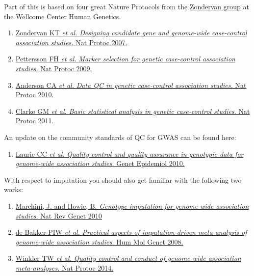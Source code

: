 \documentclass[
]{book}
\providecommand{\tightlist}{%
  \setlength{\itemsep}{0pt}\setlength{\parskip}{0pt}}
\begin{document}
Part of this is based on four great Nature Protocols from the \href{https://www.well.ox.ac.uk/research/research-groups/zondervan-group}{Zondervan group} at the Wellcome Center Human Genetics.

\begin{enumerate}
\def\labelenumi{\arabic{enumi}.}
\tightlist
\item
  \href{https://www.ncbi.nlm.nih.gov/pubmed/17947991}{Zondervan KT \emph{et al.} \emph{Designing candidate gene and genome-wide case-control association studies.} Nat Protoc 2007.}
\item
  \href{https://www.ncbi.nlm.nih.gov/pubmed/19390530}{Pettersson FH \emph{et al.} \emph{Marker selection for genetic case-control association studies.} Nat Protoc 2009.}
\item
  \href{https://www.ncbi.nlm.nih.gov/pubmed/21085122}{Anderson CA \emph{et al.} \emph{Data QC in genetic case-control association studies.} Nat Protoc 2010.}
\item
  \href{https://www.ncbi.nlm.nih.gov/pubmed/21293453}{Clarke GM \emph{et al.} \emph{Basic statistical analysis in genetic case-control studies.} Nat Protoc 2011.}
\end{enumerate}

An update on the community standards of QC for GWAS can be found here:

\begin{enumerate}
\def\labelenumi{\arabic{enumi}.}
\tightlist
\item
  \href{https://www.ncbi.nlm.nih.gov/pubmed/20718045}{Laurie CC \emph{et al.} \emph{Quality control and quality assurance in genotypic data for genome-wide association studies.} Genet Epidemiol 2010.}
\end{enumerate}

With respect to imputation you should also get familiar with the following two works:

\begin{enumerate}
\def\labelenumi{\arabic{enumi}.}
\tightlist
\item
  \href{https://doi.org/10.1038/nrg2796}{Marchini, J. and Howie, B. \emph{Genotype imputation for genome-wide association studies.} Nat Rev Genet 2010}
\item
  \href{https://www.ncbi.nlm.nih.gov/pubmed/18852200}{de Bakker PIW \emph{et al.} \emph{Practical aspects of imputation-driven meta-analysis of genome-wide association studies.} Hum Mol Genet 2008.}
\item
  \href{https://www.ncbi.nlm.nih.gov/pubmed/24762786}{Winkler TW \emph{et al.} \emph{Quality control and conduct of genome-wide association meta-analyses.} Nat Protoc 2014.}
\end{enumerate}
\end{document}

